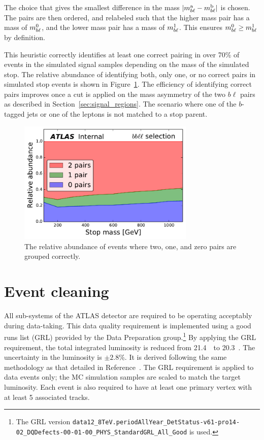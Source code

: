 The choice that gives the
smallest difference in the mass $|m_{b\ell}^\mathrm{a} - m_{b\ell}^\mathrm{b}|$
is chosen.
The pairs are then ordered, and relabeled such that the higher mass pair has a
mass of $m_{b\ell}^{0}$, and the lower mass pair has a mass of $m_{b\ell}^{1}$.
This ensures $m_{b\ell}^{0} \geq m_{b\ell}^{1}$ by definition.

This heuristic correctly identifies at least one correct pairing in over
70\% of events in the simulated signal samples
depending on the mass of the simulated stop. The relative abundance of
identifying both, only one, or no correct pairs in simulated stop events is
shown in Figure~\ref{fig:pairing_eff}.
The efficiency of identifying correct pairs improves once a cut is applied on
the mass asymmetry of the two $b\ell$ pairs as described in
Section~\ref{sec:signal_regions}.
The scenario where one of the $b$-tagged jets or one of the leptons is not
matched to a stop parent.

\begin{figure}[ht]
  \centering
  \includegraphics[width=0.75\textwidth]
    {figs/blstop/PairingEfficiencies/pairing_abundance__inclusive.pdf}
  \caption{
    The relative abundance of events where two, one, and zero
    pairs are grouped correctly.
  }
  \label{fig:pairing_eff}
\end{figure}

\FloatBarrier
\section{Event cleaning}
\label{sec:event_cleaning}

All sub-systems of the ATLAS detector are required to be operating acceptably
during data-taking. 
This data quality requirement is implemented using a good runs list (GRL)
provided by the Data Preparation group.\footnote{The GRL version
\texttt{data12\_8TeV.periodAllYear\_DetStatus-v61-pro14-02\_DQDefects-00-01-00\_PHYS\_StandardGRL\_All\_Good}
is used.}
By applying the GRL requirement, the total integrated luminosity is reduced
from 21.4~\ifb\ to 20.3~\ifb.
The uncertainty in the luminosity is $\pm 2.8$\%.
It is derived following the same methodology as that detailed
in Reference~\cite{Lumi}.
The GRL requirement is applied to data events only; the MC simulation samples
are scaled to match the target luminosity.
Each event is also required to have at least one primary vertex with at least
5 associated tracks.

